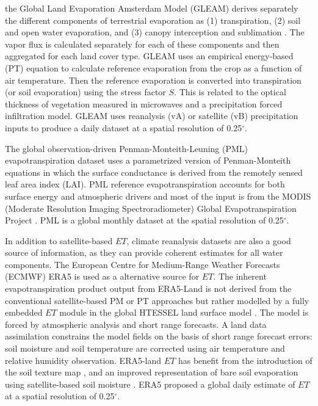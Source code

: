 \documentclass[draft]{agujournal2019}
\begin{document}
the Global Land Evaporation Amsterdam Model (GLEAM) derives separately the different components of terrestrial evaporation as 
(1) transpiration, (2) soil and open water evaporation, and (3) canopy interception and sublimation \cite{Martens2016,Miralles2011}. 
The vapor flux is calculated separately for each of these components and then aggregated for each land cover type. 
GLEAM uses an empirical energy-based  \cite{PRIESTLEY1972} (PT) equation to calculate reference evaporation from the crop as a function of air temperature. 
Then the reference evaporation is converted into transpiration (or soil evaporation) using the stress factor $S$. 
This is related to the optical thickness of vegetation measured in microwaves and a precipitation forced infiltration model. 
GLEAM uses reanalysis (vA) or satellite (vB) precipitation inputs to produce a daily dataset at a spatial resolution of 0.25$^\circ$.

The global observation-driven Penman-Monteith-Leuning (PML) \cite{CSIRO2016} evapotranspiration dataset uses a parametrized version of Penman-Monteith equations \cite{PENMAN1948,Monteith1965} in which the surface conductance is derived from the remotely sensed leaf area index (LAI). 
PML reference evapotranspiration accounts for both surface energy and atmospheric drivers and most of the input is from the MODIS (Moderate Resolution Imaging Spectroradiometer) Global Evapotranspiration Project \cite{Mu2011}. 
PML is a global monthly dataset at the spatial resolution of 0.25$^\circ$.

In addition to satellite-based $ET$, climate reanalysis datasets are also a good source of information, as they can provide coherent estimates for all water components. 
The European Centre for Medium-Range Weather Forecasts (ECMWF) ERA5 \cite{Hersbach2016} is used as a alternative source for $ET$. 
The inherent evapotranspiration product output from ERA5-Land is not derived from the conventional satellite-based PM or PT approaches 
but rather modelled by a fully embedded $ET$ module in the global HTESSEL land surface model \cite{Balsamo2015}. 
The model is forced by atmospheric analysis and short range forecasts. 
A land data assimilation constrains the model fields on the basis of short range forecast errors: 
soil moisture and soil temperature are corrected using air temperature and relative humidity observation. 
ERA5-land $ET$ has benefit from the introduction of the soil texture map \cite{Balsamo2009}, 
and an improved representation of bare soil evaporation using satellite-based soil moisture \cite{Albergel2012}. 
ERA5 proposed a global daily estimate of $ET$ at a spatial resolution of 0.25$^\circ$.
\end{document}
